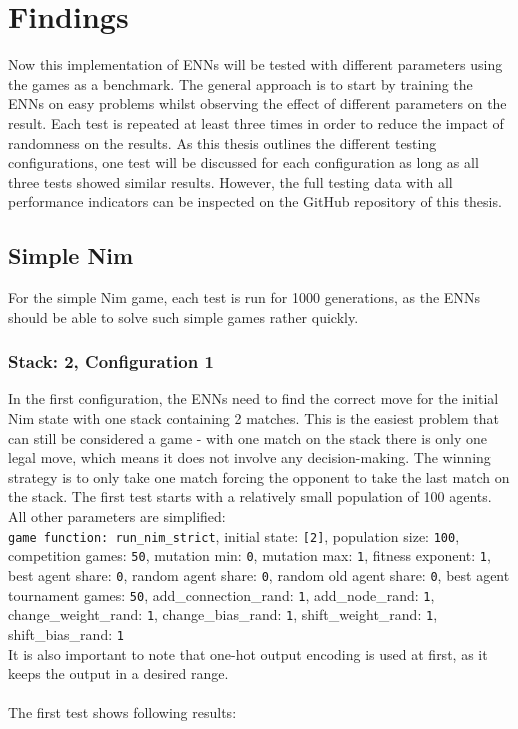 \section{Findings}\label{sec:first-findings}
Now this implementation of ENNs will be tested with different parameters using the games as a benchmark.
The general approach is to start by training the ENNs on easy problems whilst observing the effect of different parameters on the result.
Each test is repeated at least three times in order to reduce the impact of randomness on the results.
As this thesis outlines the different testing configurations, one test will be discussed for each configuration as long as all three tests showed similar results.
However, the full testing data with all performance indicators can be inspected on the GitHub repository of this thesis\cite{RustENN}.

\subsection{Simple Nim}\label{subsec:simple-nim-results}
For the simple Nim game, each test is run for 1000 generations, as the ENNs should be able to solve such simple games rather quickly.

\subsubsection{Stack: 2, Configuration 1}
In the first configuration, the ENNs need to find the correct move for the initial Nim state with one stack containing 2 matches.
This is the easiest problem that can still be considered a game - with one match on the stack there is only one legal move, which means it does not involve any decision-making.
The winning strategy is to only take one match forcing the opponent to take the last match on the stack.
The first test starts with a relatively small population of 100 agents.
All other parameters are simplified:
\\
\texttt{game function: run\_nim\_strict}, initial state: \texttt{[2]}, population size: \texttt{100}, competition games: \texttt{50}, mutation min: \texttt{0}, mutation max: \texttt{1}, fitness exponent: \texttt{1}, best agent share:
\texttt{0}, random agent share: \texttt{0}, random old agent share: \texttt{0}, best agent tournament games: \texttt{50}, add\_connection\_rand: \texttt{1}, add\_node\_rand: \texttt{1}, change\_weight\_rand: \texttt{1}, change\_bias\_rand: \texttt{1}, shift\_weight\_rand: \texttt{1}, shift\_bias\_rand: \texttt{1}\\
It is also important to note that one-hot output encoding is used at first, as it keeps the output in a desired range.
\\ \\
The first test shows following results:
\\
\newcommand{\csvpath}{../data/simple_nim/stack_2/t_1/stats.csv} %

